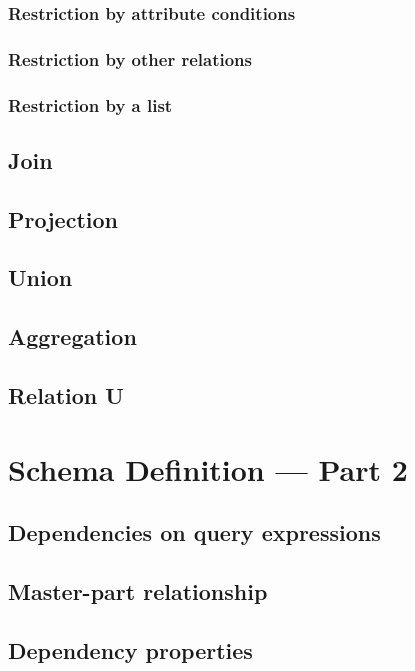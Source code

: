 \documentclass[letter,twocolumn,10pt]{article}
\begin{document}
\subsubsection{Restriction by attribute conditions}
\subsubsection{Restriction by other relations}
\subsubsection{Restriction by a list}

\subsection{Join}
\subsection{Projection}
\subsection{Union}
\subsection{Aggregation}
\subsection{Relation U}

\section{Schema Definition --- Part 2}
\subsection{Dependencies on query expressions}
\subsection{Master-part relationship}
\subsection{Dependency properties}



\end{document}
